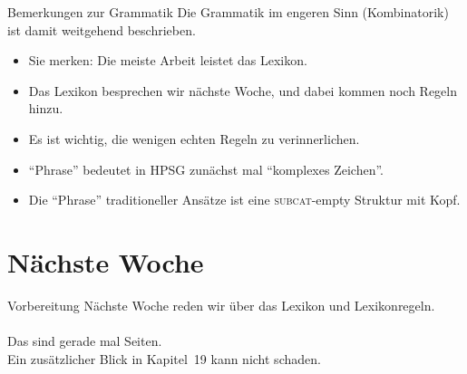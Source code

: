 \begin{frame}
  {Bemerkungen zur Grammatik}
  \onslide<+->
  \onslide<+->
  Die Grammatik im engeren Sinn (Kombinatorik) ist damit weitgehend beschrieben.\\
  \Zeile
  \begin{itemize}[<+->]
    \item Sie merken: Die meiste Arbeit leistet das Lexikon.
    \item Das Lexikon besprechen wir nächste Woche, und dabei kommen noch Regeln hinzu.
    \item Es ist wichtig, die wenigen echten Regeln zu verinnerlichen.
      \Halbzeile
    \item "`Phrase"' bedeutet in HPSG zunächst mal "`komplexes Zeichen"'.
    \item Die "`Phrase"' traditioneller Ansätze ist eine \textsc{subcat}-empty Struktur mit Kopf.
  \end{itemize}
\end{frame}

\section{Nächste Woche}

\begin{frame}
  {Vorbereitung}
  \onslide<+->
  \onslide<+->
  \centering 
  \large
  Nächste Woche reden wir über das Lexikon und Lexikonregeln.\\
  \onslide<+->
  \Zeile
  \\
  \onslide<+->
  \Halbzeile 
  Das sind gerade mal  Seiten.\\
  \Halbzeile
  \onslide<+->
  Ein zusätzlicher Blick in Kapitel~19 kann nicht schaden.\\
  \\
  \onslide<+->
  \Zeile
\end{frame}
